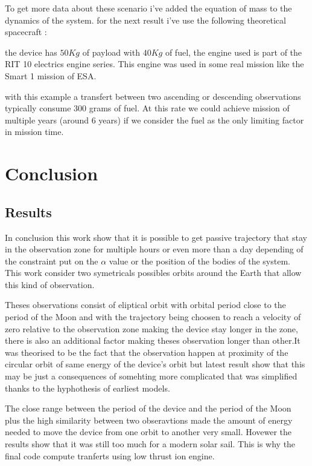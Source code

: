 \documentclass[11pt]{article} %
\begin{document}
			To get more data about these scenario i've added the equation of mass to the dynamics of the system. for the next result i've use the following theoretical spacecraft : 
			
			the device has $50Kg$ of payload with $40Kg$ of fuel, the engine used is part of the RIT 10 electrics engine series. This engine was used in some real mission like the Smart 1 mission of ESA.
			
			with this example a transfert between two ascending or descending observations typically consume 300 grams of fuel. At this rate we could achieve mission of multiple years (around 6 years) if we consider the fuel as the only limiting factor in mission time.
			 
			 
			 \section{Conclusion}
			 
			 \subsection{Results}
			 
			 In conclusion this work show that it is possible to get passive trajectory that stay in the observation zone for multiple hours or even more than a day depending of the constraint put on the $\alpha$ value or the position of the bodies of the system. This work consider two symetricals possibles orbits around the Earth that allow this kind of observation.
			 
			 Theses observations consist of eliptical orbit with orbital period close to the period of the Moon and with the trajectory being choosen to reach a velocity of zero relative to the observation zone making the device stay longer in the zone, there is also an additional factor making theses observation longer than other.It was theorised to be the fact that the observation happen at proximity of the circular orbit of same energy of the device's orbit but latest result show that this may be just a consequences of somehting more complicated that was simplified thanks to the hyphothesis of earliest models.
			 
			 The close range between the period of the device and the period of the Moon plus the high similarity between two obseravtions made the amount of energy needed to move the device from one orbit to another very small. Hovewer the results show that it was still too much for a modern solar sail. This is why the final code compute tranferts using low thrust ion engine.
			 
\end{document}
